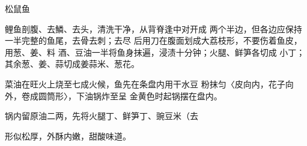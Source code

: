 \begin{recipe}{松鼠鱼}

\ingredients


\cooking

\step 	鲤鱼剖腹、去鱗、去头，清洗干净，从背脊逢中对开成 两个半边，但各边应保持一半完整的鱼尾，去骨去刺；去尽 后用刀在腹面划成大荔枝形，不要伤着鱼皮，用葱、姜、料 酒、豆油一半将鱼身抹遍，浸渍十分钟；火腿、鲜笋各切成 小丁；其余葱、姜、蒜切成姜蒜米、葱花。

\step 	菜油在旺火上烧至七成火候，鱼先在条盘内用干水豆 粉抹匀〈皮向内，花子向外，卷成圆筒形〉，下油锅炸至呈 金黄色时起锅摆在盘内。

\step 	锅内留原油二两，先将火腿丁、鲜笋丁、豌豆米（去

\notes

形似松厚，外酥内嫩，甜酸味道。

\end{recipe}

